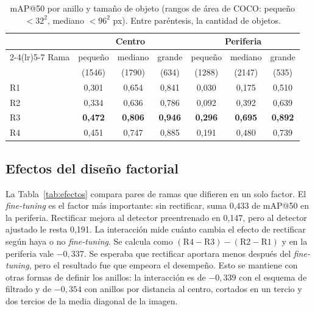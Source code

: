 \documentclass[conference]{IEEEtran}
\begin{document}
\begin{table}[t]
\centering
\caption{mAP@50 por anillo y tamaño de objeto (rangos de área de COCO: pequeño $<32^2$, mediano $<96^2$ px). Entre paréntesis, la cantidad de objetos.}
\label{tab:tamano}
\setlength{\tabcolsep}{3.4pt}
\begin{tabular}{@{}lcccccc@{}}
\toprule
 & \multicolumn{3}{c}{Centro} & \multicolumn{3}{c}{Periferia} \\
\cmidrule(lr){2-4}\cmidrule(lr){5-7}
Rama & pequeño & mediano & grande & pequeño & mediano & grande \\
 & (1546) & (1790) & (634) & (1288) & (2147) & (535) \\
\midrule
R1 & 0,301 & 0,654 & 0,841 & 0,030 & 0,175 & 0,510 \\
R2 & 0,334 & 0,636 & 0,786 & 0,092 & 0,392 & 0,639 \\
R3 & \textbf{0,472} & \textbf{0,806} & \textbf{0,946} & \textbf{0,296} & \textbf{0,695} & \textbf{0,892} \\
R4 & 0,451 & 0,747 & 0,885 & 0,191 & 0,480 & 0,739 \\
\bottomrule
\end{tabular}
\end{table}

\subsection{Efectos del diseño factorial}
La Tabla~\ref{tab:efectos} compara pares de ramas que difieren en un solo factor. El \textit{fine-tuning} es el factor más importante: sin rectificar, suma 0,433 de mAP@50 en la periferia. Rectificar mejora al detector preentrenado en 0,147, pero al detector ajustado le resta 0,191. La interacción mide cuánto cambia el efecto de rectificar según haya o no \textit{fine-tuning}. Se calcula como $(\mathrm{R4}-\mathrm{R3})-(\mathrm{R2}-\mathrm{R1})$ y en la periferia vale $-0{,}337$. Se esperaba que rectificar aportara menos después del \textit{fine-tuning}, pero el resultado fue que empeora el desempeño. Esto se mantiene con otras formas de definir los anillos: la interacción es de $-0{,}339$ con el esquema de filtrado y de $-0{,}354$ con anillos por distancia al centro, cortados en un tercio y dos tercios de la media diagonal de la imagen.
\end{document}
